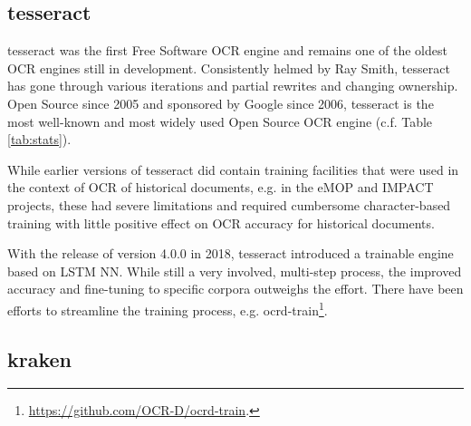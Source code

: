 \documentclass[conference]{IEEEtran}
\begin{document}

\subsection*{tesseract}

tesseract \cite{4376991} was the first Free Software OCR engine and remains one of
the oldest OCR engines still in development. Consistently helmed by Ray Smith,
tesseract has gone through various iterations and partial rewrites and changing
ownership. Open Source since 2005 and sponsored by Google since 2006, tesseract
is the most well-known and most widely used Open Source OCR engine
(c.f. Table \ref{tab:stats}).

While earlier versions of tesseract did contain training facilities that
were used in the context of OCR of historical documents, e.g. in the eMOP and
IMPACT projects, these had severe limitations and required cumbersome
character-based training with little positive effect on OCR accuracy
for historical documents.\cite{doi:10.1093/llc/fqv062}

With the release of version 4.0.0 in 2018, tesseract introduced a trainable
engine based on LSTM NN. While still a very involved, multi-step process, the
improved accuracy and fine-tuning to specific corpora outweighs the effort.
There have been efforts to streamline the training process, e.g.
ocrd-train\footnote{\url{https://github.com/OCR-D/ocrd-train}.}.


\subsection*{kraken}
\end{document}
